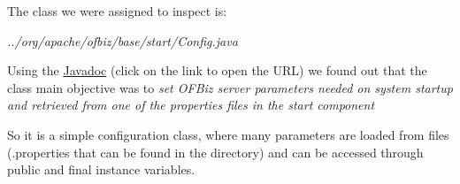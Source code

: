 The class we were assigned to inspect is:

\bigbreak
\textit{../org/apache/ofbiz/base/start/Config.java}
\bigbreak

Using the \href{https://ci.apache.org/projects/ofbiz/site/javadocs/}{Javadoc} (click on the link to open the URL) we found out that the class main objective was to
\bigbreak
\textit{set OFBiz server parameters needed on system startup and retrieved from one of the properties files in the start component}
\bigbreak

So it is a simple configuration class, where many parameters are loaded from files (.properties that can be found in the directory) and can be accessed through public and final instance variables. 
